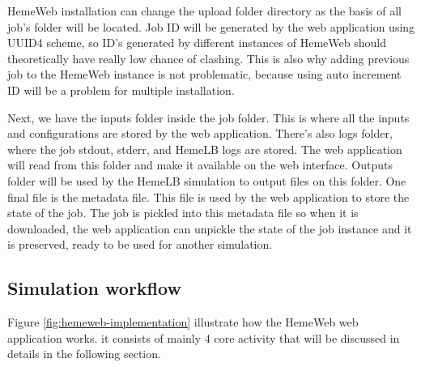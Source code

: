 HemeWeb installation can change the upload folder directory as the basis of all job's folder will be located.  Job ID will be generated by the web application using UUID4 scheme, so ID's generated by different instances of HemeWeb should theoretically have really low chance of clashing. This is also why adding previous job to the HemeWeb instance is not problematic, because using auto increment ID will be a problem for multiple installation.

Next, we have the inputs folder inside the job folder. This is where all the inputs and configurations are stored by the web application. There's also logs folder, where the job stdout, stderr, and HemeLB logs are stored. The web application will read from this folder and make it available on the web interface. Outputs folder will be used by the HemeLB simulation to output files on this folder. One final file is the metadata file. This file is used by the web application to store the state of the job. The job is pickled into this metadata file so when it is downloaded, the web application can unpickle the state of the job instance and it is preserved, ready to be used for another simulation.



\subsection{Simulation workflow}

\vspace{1cm}

\noindent%
\begin{minipage}{\linewidth}%
\label{fig:hemeweb-implementation}%
\end{minipage}

\vspace{1cm}

Figure \ref{fig:hemeweb-implementation} illustrate how the HemeWeb web application works. it consists of mainly 4 core activity that will be discussed in details in the following section.


